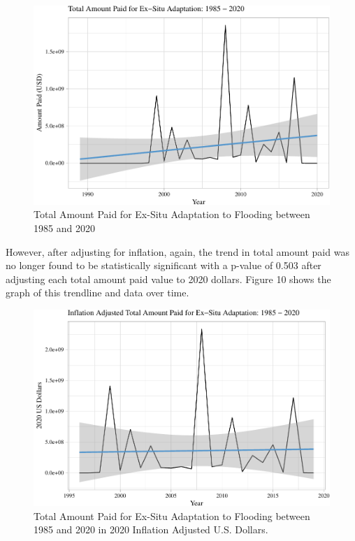 \documentclass[
  12pt,
]{article}
\begin{document}
\begin{figure}
\centering
\includegraphics{finalreport_files/figure-latex/unnamed-chunk-18-1.pdf}
\caption{Total Amount Paid for Ex-Situ Adaptation to Flooding between
1985 and 2020}
\end{figure}

\newpage

However, after adjusting for inflation, again, the trend in total amount
paid was no longer found to be statistically significant with a p-value
of 0.503 after adjusting each total amount paid value to 2020 dollars.
Figure 10 shows the graph of this trendline and data over time.

\begin{figure}
\centering
\includegraphics{finalreport_files/figure-latex/unnamed-chunk-19-1.pdf}
\caption{Total Amount Paid for Ex-Situ Adaptation to Flooding between
1985 and 2020 in 2020 Inflation Adjusted U.S. Dollars.}
\end{figure}
\end{document}
